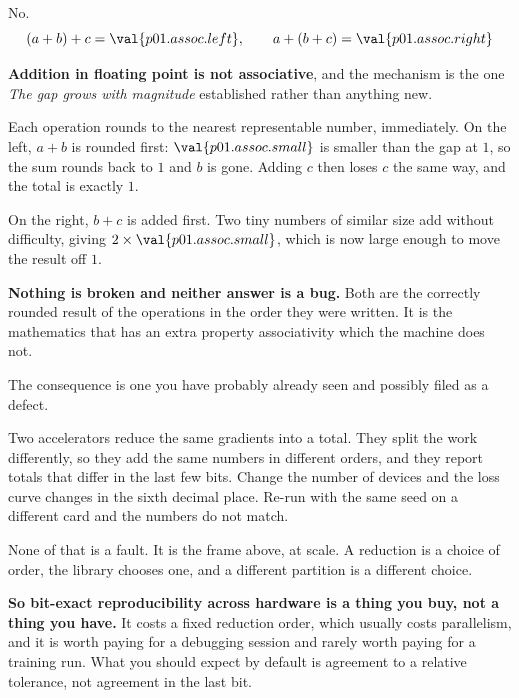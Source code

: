 \begin{fr}
\begin{ansblock}
No.
\[ (a + b) + c = \val{p01.assoc.left}, \qquad
   a + (b + c) = \val{p01.assoc.right} \]
\end{ansblock}

\begin{trapbox}
\textbf{Addition in floating point is not associative}, and the mechanism is
the one \emph{The gap grows with magnitude} established rather than anything new.

Each operation rounds to the nearest representable number, immediately. On the
left, $a + b$ is rounded first: $\val{p01.assoc.small}$ is smaller than the gap
at $1$, so the sum rounds back to $1$ and $b$ is gone. Adding $c$ then loses
$c$ the same way, and the total is exactly $1$.

On the right, $b + c$ is added first. Two tiny numbers of similar size add
without difficulty, giving $2 \times \val{p01.assoc.small}$, which is now large
enough to move the result off $1$.

\textbf{Nothing is broken and neither answer is a bug.} Both are the correctly
rounded result of the operations in the order they were written. It is the
mathematics that has an extra property \dash{} associativity \dash{} which the
machine does not.
\end{trapbox}
\end{fr}

\begin{fr}
The consequence is one you have probably already seen and possibly filed as a
defect.

Two accelerators reduce the same gradients into a total. They split the work
differently, so they add the same numbers in different orders, and they report
totals that differ in the last few bits. Change the number of devices and the
loss curve changes in the sixth decimal place. Re-run with the same seed on a
different card and the numbers do not match.

None of that is a fault. It is the frame above, at scale. A reduction is a
choice of order, the library chooses one, and a different partition is a
different choice.

\begin{warning}
\textbf{So bit-exact reproducibility across hardware is a thing you buy, not a
thing you have.} It costs a fixed reduction order, which usually costs
parallelism, and it is worth paying for a debugging session and rarely worth
paying for a training run. What you should expect by default is agreement to a
relative tolerance, not agreement in the last bit.
\end{warning}
\end{fr}

